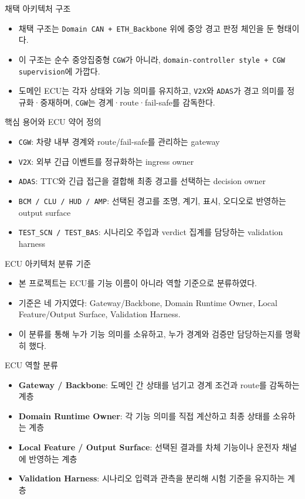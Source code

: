 \documentclass[aspectratio=169,10pt]{beamer}
\begin{document}
\begin{frame}{채택 아키텍처 구조}
\begin{itemize}
  \item 채택 구조는 \texttt{Domain CAN + ETH\_Backbone} 위에 중앙 경고 판정 체인을 둔 형태이다.
  \item 이 구조는 순수 중앙집중형 \texttt{CGW}가 아니라, \texttt{domain-controller style + CGW supervision}에 가깝다.
  \item 도메인 ECU는 각자 상태와 기능 의미를 유지하고, \texttt{V2X}와 \texttt{ADAS}가 경고 의미를 정규화·중재하며, \texttt{CGW}는 경계·route·fail-safe를 감독한다.
\end{itemize}
\end{frame}

\begin{frame}{핵심 용어와 ECU 약어 정의}
\begin{itemize}
  \item \texttt{CGW}: 차량 내부 경계와 route/fail-safe를 관리하는 gateway
  \item \texttt{V2X}: 외부 긴급 이벤트를 정규화하는 ingress owner
  \item \texttt{ADAS}: TTC와 긴급 접근을 결합해 최종 경고를 선택하는 decision owner
  \item \texttt{BCM / CLU / HUD / AMP}: 선택된 경고를 조명, 계기, 표시, 오디오로 반영하는 output surface
  \item \texttt{TEST\_SCN / TEST\_BAS}: 시나리오 주입과 verdict 집계를 담당하는 validation harness
\end{itemize}
\end{frame}

\begin{frame}{ECU 아키텍처 분류 기준}
\begin{itemize}
  \item 본 프로젝트는 ECU를 기능 이름이 아니라 역할 기준으로 분류하였다.
  \item 기준은 네 가지였다: Gateway/Backbone, Domain Runtime Owner, Local Feature/Output Surface, Validation Harness.
  \item 이 분류를 통해 누가 기능 의미를 소유하고, 누가 경계와 검증만 담당하는지를 명확히 했다.
\end{itemize}
\end{frame}

\begin{frame}{ECU 역할 분류}
\begin{itemize}
  \item \textbf{Gateway / Backbone}: 도메인 간 상태를 넘기고 경계 조건과 route를 감독하는 계층
  \item \textbf{Domain Runtime Owner}: 각 기능 의미를 직접 계산하고 최종 상태를 소유하는 계층
  \item \textbf{Local Feature / Output Surface}: 선택된 결과를 차체 기능이나 운전자 채널에 반영하는 계층
  \item \textbf{Validation Harness}: 시나리오 입력과 관측을 분리해 시험 기준을 유지하는 계층
\end{itemize}
\end{frame}
\end{document}
